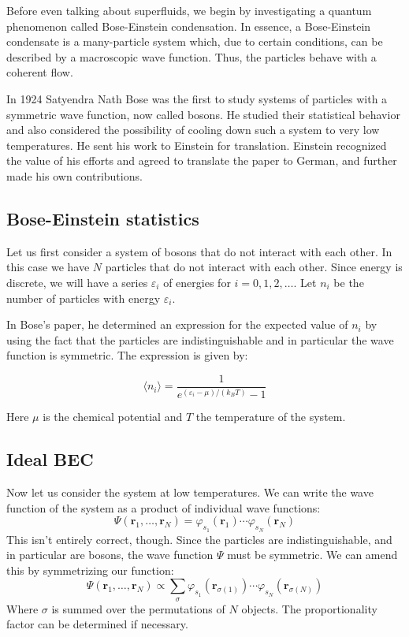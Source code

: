 \documentclass{article}
\begin{document}
Before even talking about superfluids, we begin by investigating a quantum phenomenon called Bose-Einstein condensation.  In essence,
a Bose-Einstein condensate is a many-particle system which, due to certain
conditions, can be described by a macroscopic wave function.  Thus, the particles behave with a coherent flow.

In 1924 Satyendra Nath Bose was the first to study systems of particles with a symmetric wave function, now called bosons.  He studied their statistical behavior and also considered the possibility of cooling down such a system to very low temperatures.  He sent his work to Einstein for translation.  Einstein recognized the value of his efforts and agreed to translate the paper to German, and further made his own contributions.
\\

\subsection{Bose-Einstein statistics}

Let us first consider a system of bosons that do not interact with each other.  In this case we have $N$ particles that do not interact with each other.  Since energy is discrete, we will have a series $\varepsilon_i$ of energies for $i = 0, 1, 2, \dots$.  Let $n_i$ be the number of particles with energy $\varepsilon_i$.

In Bose's paper, he determined an expression for the expected value of $n_i$ by using the fact that the particles are indistinguishable and in particular the wave function is symmetric.  The expression is given by:

\[\langle n_i \rangle = \frac{1}{e^{(\varepsilon_i-\mu)/(k_B T)} - 1}\]

Here $\mu$ is the chemical potential and $T$ the temperature of the system.

\subsection{Ideal BEC}

Now let us consider the system at low temperatures.
We can write the wave function of the system as a product of
individual wave functions:
\[\Psi(\mathbf{r}_1, \dots, \mathbf{r}_N) =
    \varphi_{s_1}(\mathbf{r}_1)\dotsb\varphi_{s_N}(\mathbf{r}_N)\]
This isn't entirely correct, though.  Since the particles are indistinguishable, and in particular are bosons, the wave function $\Psi$ must be symmetric.  We can amend this by symmetrizing our function:
\[\Psi(\mathbf{r}_1, \dots, \mathbf{r}_N) \propto \sum_{\sigma}
        \varphi_{s_1}(\mathbf{r}_{\sigma(1)})\dotsb
        \varphi_{s_N}(\mathbf{r}_{\sigma(N)})\]
Where $\sigma$ is summed over the permutations of $N$ objects.  The proportionality factor can be determined if necessary.
\\
\end{document}
